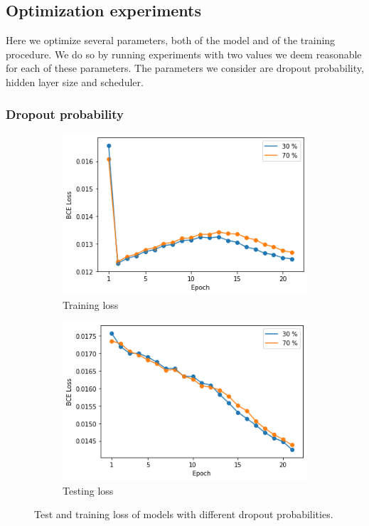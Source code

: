 \subsection{Optimization experiments} \label{supervised_approach_optim}

Here we optimize several parameters, both of the model and of the training procedure. We do so by running experiments with two values we deem reasonable for each of these parameters. The parameters we consider are dropout probability, hidden layer size and scheduler.

\subsubsection{Dropout probability}

\begin{figure}
  \begin{subfigure}[t]{.5\textwidth}
    \centering
    \includegraphics[width=\textwidth]{figures/supervised_approach/dropout_train_loss.png}
    \caption{Training loss}
    \label{fig:dropout_train_loss}
  \end{subfigure}
   \begin{subfigure}[t]{.5\textwidth}
    \centering
    \includegraphics[width=\textwidth]{figures/supervised_approach/dropout_test_loss.png}
    \caption{Testing loss}
    \label{fig:dropout_test_loss}
  \end{subfigure}
  \caption{Test and training loss of models with different dropout probabilities.}
  \label{fig:dropout_train}
\end{figure}

